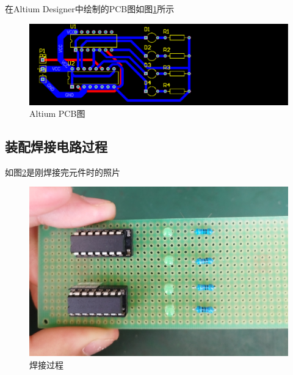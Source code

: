 \documentclass{ctexart}
\begin{document}
在Altium Designer中绘制的PCB图如图\ref{altiumPCB图}所示
\begin{figure}
    \centering
    \includegraphics[scale=0.7]{pic/altiumPCB图.png}
    \caption{Altium PCB图}
    \label{altiumPCB图}
\end{figure}
\subsection{装配焊接电路过程}
如图\ref{焊接过程}是刚焊接完元件时的照片
\begin{figure}[H]
    \centering
    \includegraphics[scale=0.1]{pic/焊接过程.jpg}
    \caption{焊接过程}
    \label{焊接过程}
\end{figure}
\end{document}
